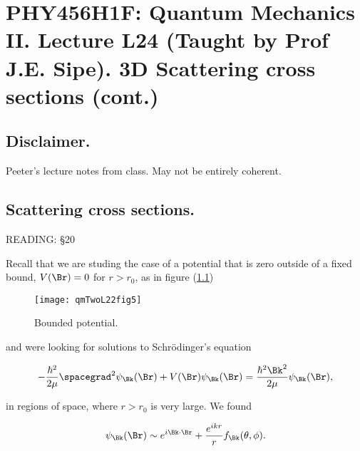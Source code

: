 
%

%
%
%

\chapter{PHY456H1F: Quantum Mechanics II.  Lecture L24 (Taught by Prof J.E. Sipe).  3D Scattering cross sections (cont.)}
\label{chap:qmTwoL24}
{}
\date{Dec 5, 2011}

\beginArtWithToc

\section{Disclaimer.}

Peeter's lecture notes from class.  May not be entirely coherent.

\section{Scattering cross sections.}

READING: \S 20 \cite{desai2009quantum}

Recall that we are studing the case of a potential that is zero outside of a fixed bound, $V(\Br) = 0$ for $r > r_0$, as in figure (\ref{fig:qmTwoL24:qmTwoL22fig5})

\begin{figure}[htp]
   \centering
   \texttt{[image: qmTwoL22fig5]}
   \caption{Bounded potential.}\label{fig:qmTwoL24:qmTwoL22fig5}
\end{figure}

and were looking for solutions to Schr\"{o}dinger's equation 

\begin{equation}\label{eqn:qmTwoL24:10}
-\frac{\hbar^2}{2\mu} \spacegrad^2
\psi_\Bk(\Br)
+ V(\Br)
\psi_\Bk(\Br)
=
\frac{\hbar^2 \Bk^2}{2 \mu}
\psi_\Bk(\Br),
\end{equation}

in regions of space, where $r > r_0$ is very large.  We found

\begin{equation}\label{eqn:qmTwoL24:30}
\psi_\Bk(\Br) \sim e^{i \Bk \cdot \Br} + \frac{e^{i k r}}{r} f_\Bk(\theta, \phi).
\end{equation}

